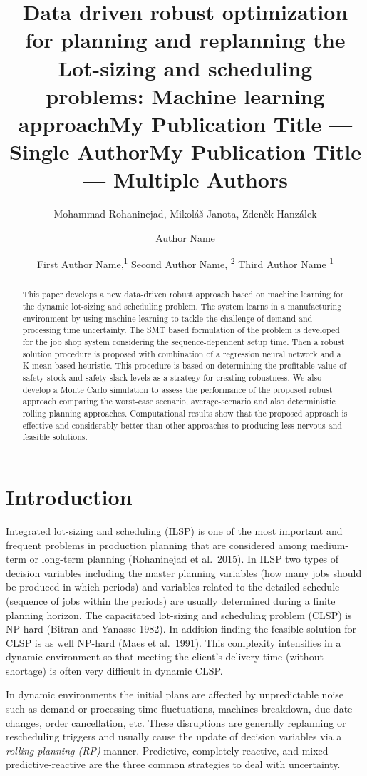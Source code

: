 \documentclass[letterpaper]{article} %
\title{Data driven robust optimization for planning and replanning the Lot-sizing and scheduling problems: Machine learning approach}
\author{Mohammad Rohaninejad, Mikoláš Janota, Zdeněk Hanzálek
}
\title{My Publication Title --- Single Author}
\author {
    Author Name \\
}
\title{My Publication Title --- Multiple Authors}
\author {

        First Author Name,\textsuperscript{\rm 1}
        Second Author Name, \textsuperscript{\rm 2}
        Third Author Name \textsuperscript{\rm 1} \\
}
\begin{document}
\maketitle

\begin{abstract}
This paper develops a new data-driven robust approach based on machine learning for the dynamic lot-sizing and scheduling problem. The system learns in a manufacturing environment by using machine learning to tackle the challenge of demand and processing time uncertainty. The SMT based formulation of the problem is developed for the job shop system considering the sequence-dependent setup time. Then a robust solution procedure is proposed with combination of a regression neural network and a K-mean based heuristic. This procedure is based on determining the profitable value of safety stock and safety slack levels as a strategy for creating robustness. We also develop a Monte Carlo simulation to assess the performance of the proposed robust approach comparing the worst-case scenario, average-scenario and also deterministic rolling planning approaches. Computational results show that the proposed approach is effective and considerably better than other approaches to producing less nervous and feasible solutions. 
\end{abstract}

\section{Introduction}

Integrated lot-sizing and scheduling (ILSP) is one of the most important and frequent problems in production planning that are considered among medium-term or long-term planning (Rohaninejad et al.\ 2015). In ILSP two types of decision variables including the master planning variables (how  many jobs should be produced in which periods) and variables related to the detailed schedule (sequence of jobs within the periods) are usually determined during a finite planning horizon. The capacitated lot-sizing and scheduling problem (CLSP) is NP-hard (Bitran and Yanasse 1982). In addition finding the feasible solution for CLSP is as well NP-hard (Maes et al.\ 1991). This complexity  intensifies in a dynamic environment so that meeting the client's delivery time (without shortage) is often very difficult in dynamic CLSP. 

In dynamic environments the initial plans are affected by unpredictable noise such as demand or processing time fluctuations, machines breakdown, due date changes, order cancellation, etc. These disruptions are generally replanning or rescheduling triggers and usually cause the update of decision variables via a \emph{rolling  planning (RP)} manner. Predictive, completely reactive, and mixed predictive-reactive are the three common strategies to deal with uncertainty.
\end{document}
